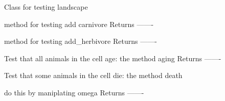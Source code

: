 \documentclass[a4paper,10pt,english]{sphinxmanual}
\begin{document}
\begin{fulllineitems}
\label{\detokenize{tests:biosim.tests.test_landscape.TestLandscape}}
Class for testing landscape

\begin{fulllineitems}
\label{\detokenize{tests:biosim.tests.test_landscape.TestLandscape.test_add_carnivores}}
method for testing add carnivore
Returns
-------

\end{fulllineitems}


\begin{fulllineitems}
\label{\detokenize{tests:biosim.tests.test_landscape.TestLandscape.test_add_herbivore}}
method for testing add\_herbivore
Returns
-------

\end{fulllineitems}


\begin{fulllineitems}
\label{\detokenize{tests:biosim.tests.test_landscape.TestLandscape.test_aging}}
Test that all animals in the cell age: the method aging
Returns
-------

\end{fulllineitems}


\begin{fulllineitems}
\label{\detokenize{tests:biosim.tests.test_landscape.TestLandscape.test_death}}
Test that some animals in the cell die: the method death

do this by maniplating omega
Returns
-------

\end{fulllineitems}



\end{fulllineitems}
\end{document}
